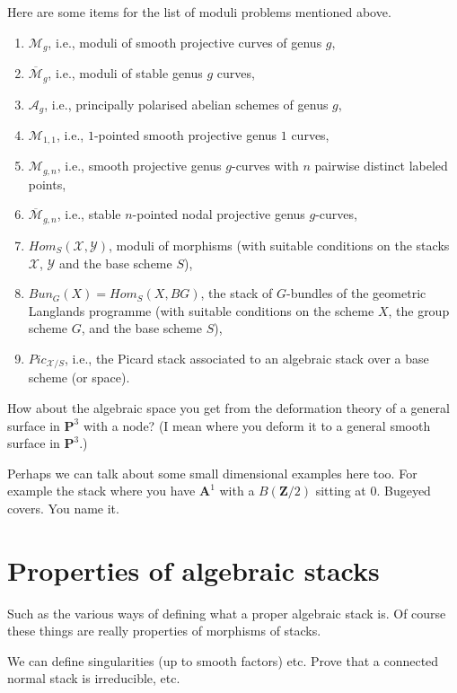 \medskip\noindent
Here are some items for the list of moduli problems mentioned above.
\begin{enumerate}
\item $\mathcal{M}_g$, i.e., moduli of smooth projective curves of genus $g$,
\item $\overline{\mathcal{M}}_g$, i.e., moduli of stable genus $g$ curves,
\item $\mathcal{A}_{g}$,
i.e., principally polarised abelian schemes of genus $g$,
\item $\mathcal{M}_{1,1}$, i.e.,
$1$-pointed smooth projective genus $1$ curves,
\item $\mathcal{M}_{g, n}$, i.e., smooth projective genus $g$-curves
with $n$ pairwise distinct labeled points,
\item $\overline{\mathcal{M}}_{g, n}$, i.e., 
stable $n$-pointed nodal projective genus $g$-curves,
\item $\textit{Hom}_S(\mathcal{X},\mathcal{Y})$, moduli of morphisms
(with suitable conditions on the stacks $\mathcal{X}$, $\mathcal{Y}$
and the base scheme $S$),
\item $\textit{Bun}_G(X) = \textit{Hom}_S(X,BG)$, the stack of $G$-bundles
of the geometric Langlands programme (with suitable conditions on the scheme
$X$, the group scheme $G$, and the base scheme $S$),
\item $\textit{Pic}_{\mathcal{X}/S}$, i.e., the Picard stack associated
to an algebraic stack over a base scheme (or space).
\end{enumerate}

\medskip\noindent
How about the algebraic space you get from the deformation theory of
a general surface in $\mathbf{P}^3$ with a node? (I mean where you deform
it to a general smooth surface in $\mathbf{P}^3$.)

\medskip\noindent
Perhaps we can talk about some small dimensional examples here too.
For example the stack where you have $\mathbf{A}^1$ with a $B(\mathbf{Z}/2)$
sitting at $0$. Bugeyed covers. You name it.

\section{Properties of algebraic stacks}
\label{section-stacks-properties}

\noindent
Such as the various ways of defining what a proper algebraic stack is.
Of course these things are really properties of morphisms of stacks.

\medskip\noindent
We can define singularities (up to smooth factors) etc. Prove that a
connected normal stack is irreducible, etc.

